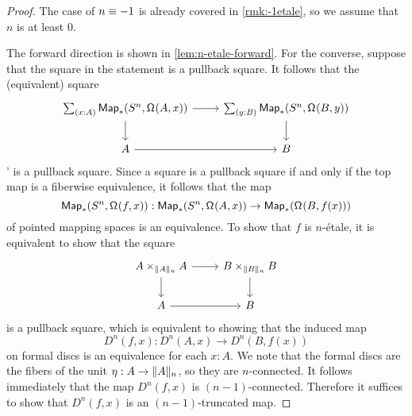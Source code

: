 \documentclass[9pt,twosided]{amsart}
\begin{document}
\begin{proof}
  The case of $n\equiv -1$ is already covered in \cref{rmk:-1etale}, so we assume that $n$ is at least $0$.
  
  The forward direction is shown in \cref{lem:n-etale-forward}. For the converse, suppose that the square in the statement is a pullback square. It follows that the (equivalent) square
  \begin{equation*}
    \begin{tikzcd}
      \sm{x:A}\mathsf{Map}_\ast(\sphere{n},\loopspace{A,x}) \arrow[r] \arrow[d] & \sm{y:B} \mathsf{Map}_\ast(\sphere{n},\loopspace{B,y}) \arrow[d] \\
      A \arrow[r] & B
    \end{tikzcd}
  \end{equation*}
' is a pullback square.
  Since a square is a pullback square if and only if the top map is a fiberwise equivalence, it follows that the map
  \begin{equation*}
    \mathsf{Map}_\ast(S^{n},\mathsf{\Omega}^{}(f,x)):\mathsf{Map}_\ast(S^{n},\mathsf{\Omega}^{}(A,x)) \to \mathsf{Map}_\ast(\mathsf{\Omega}^{}(B,f(x)))
  \end{equation*}
  of pointed mapping spaces is an equivalence. To show that $f$ is $n$-\'etale, it is equivalent to show that the square
  \begin{equation*}
    \begin{tikzcd}
      A\times_{\trunc{n}{A}} A \arrow[r] \arrow[d] & B \times_{\trunc{n}{B}} B \arrow[d] \\
      A \arrow[r] & B
    \end{tikzcd}
  \end{equation*}
  is a pullback square, which is equivalent to showing that the induced map
  \begin{equation*}
    D^{n}(f,x):D^{n}(A,x)\to D^{n}(B,f(x))
  \end{equation*}
  on formal discs is an equivalence for each $x:A$. We note that the formal discs are the fibers of the unit $\eta:A \to \trunc{n}{A}$, so they are $n$-connected. It follows immediately that the map $D^{n}(f,x)$ is $(n-1)$-connected. Therefore it suffices to show that $D^{n}(f,x)$ is an $(n-1)$-truncated map.


\end{proof}
\end{document}
